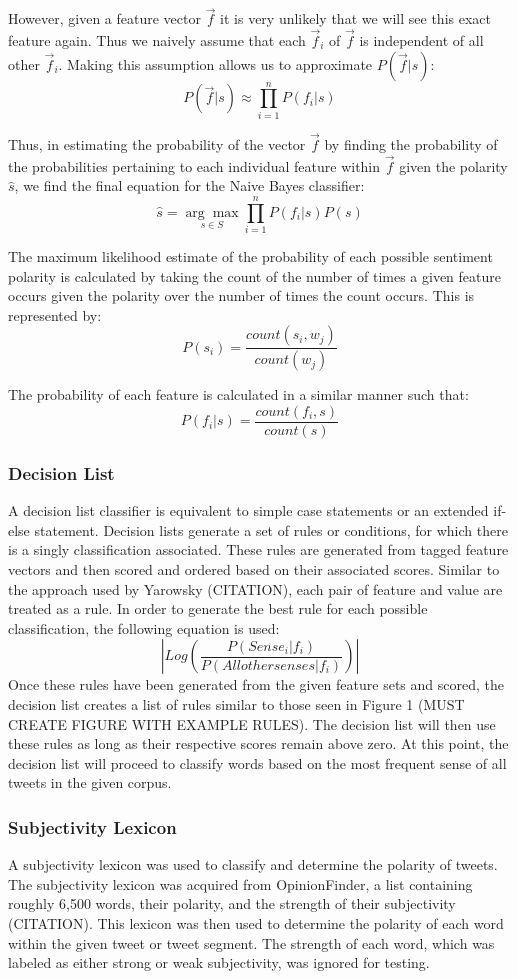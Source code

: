 \documentclass[11pt]{article}
\begin{document}
However, given a feature vector $\vec{f}$ it is very unlikely that we will see
this exact feature again. Thus we naively assume that each $\vec{f}_i$ of 
$\vec{f}$ is independent of all other $\vec{f}_i$. Making this assumption
allows us to approximate $P(\vec{f}|s)$:
\[P(\vec{f}|s)\approx{\prod_{i=1}^n}P(f_i|s)\]

Thus, in estimating the probability of the vector $\vec{f}$ by finding the
probability of the probabilities pertaining to each individual feature within
$\vec{f}$ given the polarity $\hat{s}$, we find the final equation for the
Naive Bayes classifier:
\[\hat{s}= \underset{{s}\in{S}}{\arg\max}{{\prod_{i=1}^n}P(f_i|s)}P(s)\]

The maximum likelihood estimate of the probability of each possible sentiment
polarity is calculated by taking the count of the number of times a given 
feature occurs given the polarity over the number of times the count occurs. 
This is represented by:
\[P(s_i) = \frac{count(s_i,w_j)}{count(w_j)}\]

The probability of each feature is calculated in a similar manner such that:
\[P(f_i|s) = \frac{count(f_i,s)}{count(s)}\]

\subsubsection{Decision List}
A decision list classifier is equivalent to simple case statements or an extended if-else statement. Decision lists generate a set of rules or conditions, for which there is a singly classification associated. These rules are generated from tagged feature vectors and then scored and ordered based on their associated scores. Similar to the approach used by Yarowsky (CITATION), each pair of feature and value are treated as a rule. In order to generate the best rule for each possible classification, the following equation is used:
\[\left|Log\left({\frac{P(Sense_i|f_i)}{P(All other senses|f_i)}}\right)\right|\]
\indent Once these rules have been generated from the given feature sets and scored, the decision list creates a list of rules similar to those seen in Figure 1 (MUST CREATE FIGURE WITH EXAMPLE RULES). The decision list will then use these rules as long as their respective scores remain above zero. At this point, the decision list will proceed to classify words based on the most frequent sense of all tweets in the given corpus.  

\subsubsection{Subjectivity Lexicon}
A subjectivity lexicon was used to classify and determine the polarity of tweets. The subjectivity lexicon was acquired from OpinionFinder, a list containing roughly 6,500 words, their polarity, and the strength of their subjectivity (CITATION). This lexicon was then used to determine the polarity of each word within the given tweet or tweet segment. The strength of each word, which was labeled as either strong or weak subjectivity, was ignored for testing.
\end{document}
